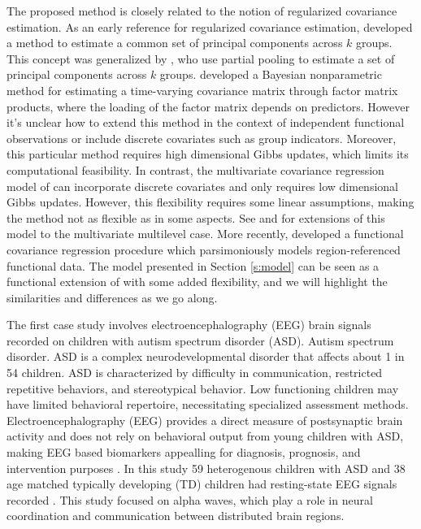 \documentclass[useAMS,referee,usenatbib]{biom}
\begin{document}
The proposed method is closely related to the notion of regularized covariance estimation. As an early reference for regularized covariance estimation, \citet{Flury1984} developed a method to estimate a common set of principal components across $k$ groups. This concept was generalized by \citet{Franks2019}, who use partial pooling to estimate a set of principal components across $k$ groups. \citet{Fox2015} developed a Bayesian nonparametric method for estimating a time-varying covariance matrix through factor matrix products, where the loading of the factor matrix depends on predictors. However it's unclear how to extend this method in the context of independent functional observations or include discrete covariates such as group indicators. Moreover, this particular method requires high dimensional Gibbs updates, which limits its computational feasibility. In contrast, the multivariate covariance regression model of \citet{Hoff2012} can incorporate discrete covariates and only requires low dimensional Gibbs updates. However, this flexibility requires some linear assumptions, making the method not as flexible as \citet{Fox2015} in some aspects. See \citet{Li2014} and \citet{Quintero2017} for extensions of this model to the multivariate multilevel case. More recently, \citet{Scheffler2019} developed a functional covariance regression procedure which parsimoniously models region-referenced functional data. The model presented in Section \ref{s:model} can be seen as a functional extension of \citet{Hoff2012} with some added flexibility, and we will highlight the similarities and differences as we go along. 

The first case study involves electroencephalography (EEG) brain signals recorded on children with autism spectrum disorder (ASD). Autism spectrum disorder. ASD is a complex neurodevelopmental disorder that affects about 1 in 54 children. ASD is characterized by difficulty in communication, restricted repetitive behaviors, and stereotypical behavior. Low functioning children may have limited behavioral repertoire, necessitating specialized assessment methods. Electroencephalography (EEG) provides a direct measure of postsynaptic brain activity and does not rely on behavioral output from young children with ASD, making EEG based biomarkers appealling for diagnosis, prognosis, and intervention purposes \citep*{Jeste2015}. In this study 59 heterogenous children with ASD and 38 age matched typically developing (TD) children had resting-state EEG signals recorded \citep*{Dickinson2017}. This study focused on alpha waves, which play a role in neural coordination and communication between distributed brain regions.
\end{document}
